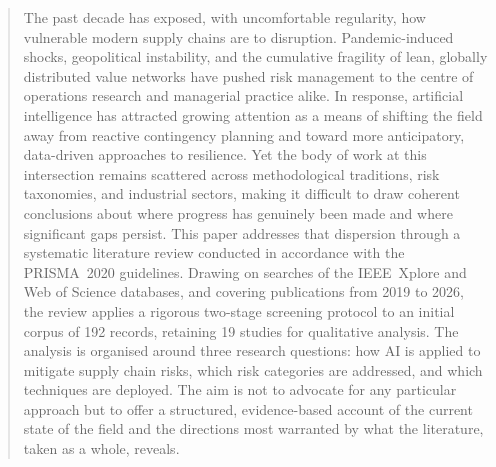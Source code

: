 \begin{abstract}
The past decade has exposed, with uncomfortable regularity, how vulnerable
modern supply chains are to disruption. Pandemic-induced shocks, geopolitical
instability, and the cumulative fragility of lean, globally distributed value
networks have pushed risk management to the centre of operations research
and managerial practice alike. In response, artificial intelligence has attracted
growing attention as a means of shifting the field away from reactive
contingency planning and toward more anticipatory, data-driven approaches
to resilience. Yet the body of work at this intersection remains scattered
across methodological traditions, risk taxonomies, and industrial sectors,
making it difficult to draw coherent conclusions about where progress has
genuinely been made and where significant gaps persist. This paper addresses 
that dispersion through a systematic literature review
conducted in accordance with the PRISMA~2020 guidelines. Drawing on searches
of the IEEE~Xplore and Web of Science databases, and covering publications
from 2019 to 2026, the review applies a rigorous two-stage screening protocol
to an initial corpus of 192 records, retaining 19 studies for qualitative
analysis. The analysis is organised around three research questions: how AI
is applied to mitigate supply chain risks, which risk categories are addressed,
and which techniques are deployed. The aim is not to advocate for any
particular approach but to offer a structured, evidence-based account of the
current state of the field and the directions most warranted by what the
literature, taken as a whole, reveals.

\end{abstract}
